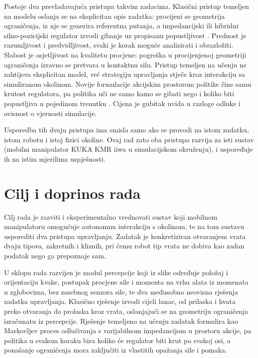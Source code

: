 Postoje dva prevladavajuća pristupa takvim zadacima. Klasični pristup temeljen na
modelu oslanja se na eksplicitan opis zadatka: procijeni se geometrija ograničenja, iz nje se
generira referentna putanja, a impedancijski ili hibridni silno-pozicijski regulator izvodi
gibanje uz propisanu popustljivost \cite{khatib1987operational}. Prednost je razumljivost i
predvidljivost, svaki je korak moguće analizirati i obrazložiti. Slabost je osjetljivost na
kvalitetu procjene: pogreška u procijenjenoj geometriji ograničenja izravno se pretvara u
kontaktnu silu. Pristup temeljen na učenju ne zahtijeva eksplicitan model, već strategiju
upravljanja stječe kroz interakciju sa simuliranom okolinom. Novije formulacije akcijskim
prostorom politike čine samu krutost regulatora, pa politika uči ne samo kamo se gibati nego i
koliko biti popustljiva u pojedinom trenutku \cite{martinmartin2019variable}. Cijena je gubitak
uvida u razloge odluke i ovisnost o vjernosti simulacije.

Usporedba tih dvaju pristupa ima smisla samo ako se provodi na istom zadatku, istom robotu i
istoj fizici okoline. Ovaj rad zato oba pristupa razvija za isti sustav (mobilni manipulator
KUKA KMR iiwa u simulacijskom okruženju), i uspoređuje ih na istim mjerilima uspješnosti.

\section{Cilj i doprinos rada}
\label{sec:cilj}

Cilj rada je razviti i eksperimentalno vrednovati sustav koji mobilnom manipulatoru omogućuje
autonomnu interakciju s okolinom, te na tom sustavu usporediti dva pristupa upravljanju. Zadatak
je konkretiziran otvaranjem vrata dvaju tipova, zakretnih i kliznih, pri čemu robot tip vrata ne
dobiva kao zadan podatak nego ga prepoznaje sam.

U sklopu rada razvijen je modul percepcije koji iz slike određuje položaj i orijentaciju kvake,
postupak procjene sile i momenta na vrhu alata iz momenata u zglobovima, bez zasebnog senzora
sile, te dva međusobno neovisna rješenja zadatka upravljanja. Klasično rješenje izvodi cijeli
lanac, od prilaska i hvata preko otvaranja do prolaska kroz vrata, oslanjajući se na geometriju
ograničenja izračunatu iz percepcije. Rješenje temeljeno na učenju zadatak formulira kao Markovljev
proces odlučivanja s varijabilnom impedancijom u prostoru akcije, pa politika u svakom koraku bira
koliko će regulator biti krut po svakoj osi, a ponašanje ograničenja mora zaključiti iz vlastitih
opažanja sile i pomaka.

